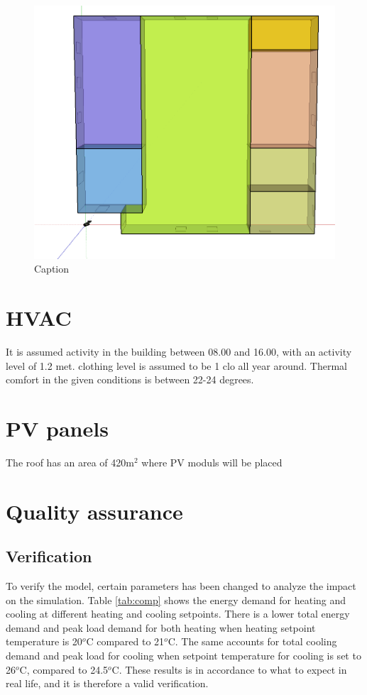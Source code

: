 \begin{figure}[h!]
    \centering
    \includegraphics[scale=0.5]{vedlegg/zone.png}
    \caption{Caption}
    \label{fig:thermal}
\end{figure}

\section{HVAC}
It is assumed activity in the building between 08.00 and 16.00, with an activity level of 1.2 met. clothing level is assumed to be 1 clo all year around. Thermal comfort in the given conditions is between 22-24 degrees. 
\section{PV panels}
The roof has an area of 420m$^2$ where PV moduls will be placed

\section{Quality assurance}
\subsection{Verification}

To verify the model, certain parameters has been changed to analyze the impact on the simulation. Table \ref{tab:comp} shows the energy demand for heating and cooling at different heating and cooling setpoints. There is a lower total energy demand and peak load demand for both heating when heating setpoint temperature is 20$^o$C compared to 21$^o$C. The same accounts for total cooling demand and peak load for cooling when setpoint temperature for cooling is set to 26$^o$C, compared to 24.5$^o$C. These results is in accordance to what to expect in real life, and it is therefore a valid verification. 


